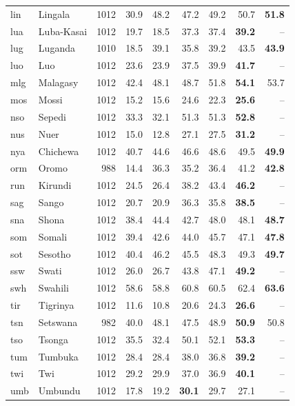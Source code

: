 {\begin{longtable}{@{}llrrrrrrr@{}}
lin & Lingala & 1012 & 30.9 & 48.2 & 47.2 & 49.2 & 50.7 & \textbf{51.8} \\
lua & Luba-Kasai & 1012 & 19.7 & 18.5 & 37.3 & 37.4 & \textbf{39.2} & -- \\
lug & Luganda & 1010 & 18.5 & 39.1 & 35.8 & 39.2 & 43.5 & \textbf{43.9} \\
luo & Luo & 1012 & 23.6 & 23.9 & 37.5 & 39.9 & \textbf{41.7} & -- \\
mlg & Malagasy & 1012 & 42.4 & 48.1 & 48.7 & 51.8 & \textbf{54.1} & 53.7 \\
mos & Mossi & 1012 & 15.2 & 15.6 & 24.6 & 22.3 & \textbf{25.6} & -- \\
nso & Sepedi & 1012 & 33.3 & 32.1 & 51.3 & 51.3 & \textbf{52.8} & -- \\
nus & Nuer & 1012 & 15.0 & 12.8 & 27.1 & 27.5 & \textbf{31.2} & -- \\
nya & Chichewa & 1012 & 40.7 & 44.6 & 46.6 & 48.6 & 49.5 & \textbf{49.9} \\
orm & Oromo & 988 & 14.4 & 36.3 & 35.2 & 36.4 & 41.2 & \textbf{42.8} \\
run & Kirundi & 1012 & 24.5 & 26.4 & 38.2 & 43.4 & \textbf{46.2} & -- \\
sag & Sango & 1012 & 20.7 & 20.9 & 36.3 & 35.8 & \textbf{38.5} & -- \\
sna & Shona & 1012 & 38.4 & 44.4 & 42.7 & 48.0 & 48.1 & \textbf{48.7} \\
som & Somali & 1012 & 39.4 & 42.6 & 44.0 & 45.7 & 47.1 & \textbf{47.8} \\
sot & Sesotho & 1012 & 40.4 & 46.2 & 45.5 & 48.3 & 49.3 & \textbf{49.7} \\
ssw & Swati & 1012 & 26.0 & 26.7 & 43.8 & 47.1 & \textbf{49.2} & -- \\
swh & Swahili & 1012 & 58.6 & 58.8 & 60.8 & 60.5 & 62.4 & \textbf{63.6} \\
tir & Tigrinya & 1012 & 11.6 & 10.8 & 20.6 & 24.3 & \textbf{26.6} & -- \\
tsn & Setswana & 982 & 40.0 & 48.1 & 47.5 & 48.9 & \textbf{50.9} & 50.8 \\
tso & Tsonga & 1012 & 35.5 & 32.4 & 50.1 & 52.1 & \textbf{53.3} & -- \\
tum & Tumbuka & 1012 & 28.4 & 28.4 & 38.0 & 36.8 & \textbf{39.2} & -- \\
twi & Twi & 1012 & 29.2 & 29.9 & 37.0 & 36.9 & \textbf{40.1} & -- \\
umb & Umbundu & 1012 & 17.8 & 19.2 & \textbf{30.1} & 29.7 & 27.1 & -- \\

\end{longtable}}
